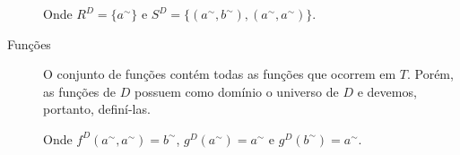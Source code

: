 \begin{description}
\begin{center}
\begin{tikzpicture}[modal]
        \end{tikzpicture}
    \end{center}
    Onde $R^D = \{a^\sim\}$ e $S^D = \{(a^\sim, b^\sim), (a^\sim, a^\sim)\}$.
    \item[Funções] O conjunto de funções contém todas as funções que ocorrem em $T$. Porém, as funções de $D$ possuem como domínio o universo de $D$ e devemos, portanto, definí-las. 
    \begin{center}
    \end{center}
    Onde $f^D(a^\sim, a^\sim) = b^\sim$, $g^D(a^\sim) = a^\sim$ e $g^D(b^\sim) = a^\sim$.
\end{description}

